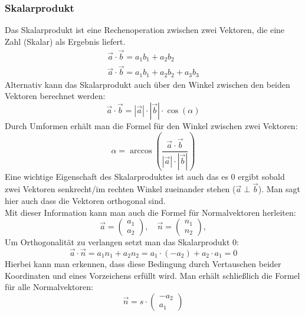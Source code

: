 \subsubsection{Skalarprodukt}
Das Skalarprodukt ist eine Rechenoperation zwischen zwei Vektoren, die eine Zahl (Skalar) als Ergebnis liefert.
\begin{align}
    \vec{a} \cdot \vec{b} = a_1 b_1 + a_2 b_2 \\
    \vec{a} \cdot \vec{b} = a_1 b_1 + a_2 b_2  + a_3 b_3 
\end{align}
Alternativ kann das Skalarprodukt auch über den Winkel zwischen den beiden Vektoren berechnet werden:
\begin{equation}
    \vec{a}\cdot\vec{b} = |\vec{a}|\cdot|\vec{b}|\cdot\cos{(\alpha)}
\end{equation}
Durch Umformen erhält man die Formel für den Winkel zwischen zwei Vektoren:
\begin{equation}
    \alpha = \arccos{\left(\frac{\vec{a}\cdot\vec{b}}{|\vec{a}|\cdot|\vec{b}|}\right)}
\end{equation}
Eine wichtige Eigenschaft des Skalarproduktes ist auch das es 0 ergibt sobald zwei Vektoren senkrecht/im rechten Winkel zueinander stehen (\(\vec{a}\perp \vec{b}\)). Man sagt hier auch dass die Vektoren orthogonal sind.\\
Mit dieser Information kann man auch die Formel für Normalvektoren herleiten:
\begin{equation}
    \vec{a} = \begin{pmatrix} a_1 \\ a_2 \end{pmatrix},\quad 
    \vec{n} = \begin{pmatrix} n_1 \\ n_2 \end{pmatrix},
\end{equation}
Um Orthogonalität zu verlangen setzt man das Skalarprodukt 0:
\begin{equation}
    \vec{a} \cdot \vec{n} = a_1 n_1 + a_2 n_2 = a_1\cdot(-a_2) + a_2\cdot a_1=0
\end{equation}
Hierbei kann man erkennen, dass diese Bedingung durch Vertauschen beider Koordinaten und eines Vorzeichens erfüllt wird. Man erhält schließlich die Formel für alle Normalvektoren:
\begin{equation}
    \vec{n} = s\cdot\begin{pmatrix} -a_2 \\ a_1 \end{pmatrix}
\end{equation}


